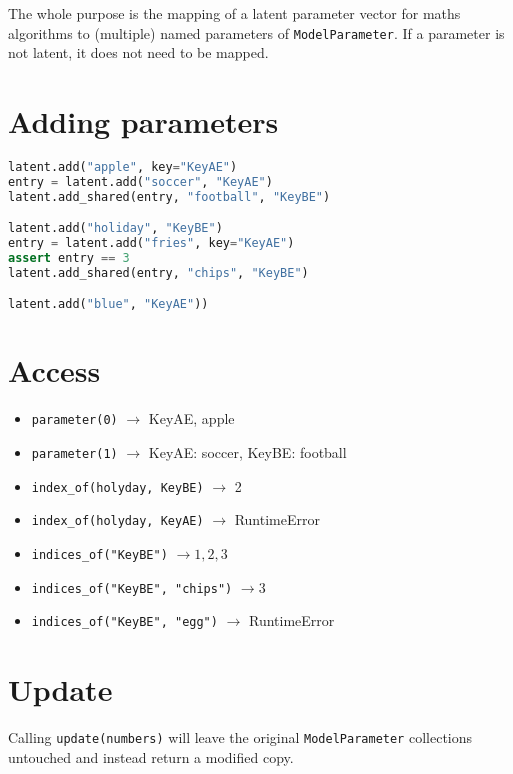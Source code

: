 \documentclass{article}
\begin{document}
The whole purpose is the mapping of a latent parameter vector for maths algorithms
to (multiple) named parameters of \texttt{ModelParameter}. If a parameter is not 
latent, it does not need to be mapped.

\section{Adding parameters}

\begin{lstlisting}[basicstyle=\ttfamily, language=python]
latent.add("apple", key="KeyAE") 
entry = latent.add("soccer", "KeyAE")
latent.add_shared(entry, "football", "KeyBE")

latent.add("holiday", "KeyBE")
entry = latent.add("fries", key="KeyAE")
assert entry == 3
latent.add_shared(entry, "chips", "KeyBE")

latent.add("blue", "KeyAE"))
\end{lstlisting}

\section{Access}

\begin{itemize}
  \item \texttt{parameter(0)} $\to$ KeyAE, apple
  \item \texttt{parameter(1)} $\to$ KeyAE: soccer, KeyBE: football
  \item \texttt{index\_of(holyday, KeyBE)} $\to$ 2
  \item \texttt{index\_of(holyday, KeyAE)} $\to$ RuntimeError
  \item \texttt{indices\_of("KeyBE")} $\to 1,2,3$
  \item \texttt{indices\_of("KeyBE", "chips")} $\to 3$
  \item \texttt{indices\_of("KeyBE", "egg")} $\to$ RuntimeError
\end{itemize}

\section{Update}

Calling \texttt{update(numbers)} will leave the original \texttt{ModelParameter} 
collections untouched and instead return a modified copy.
\end{document}
